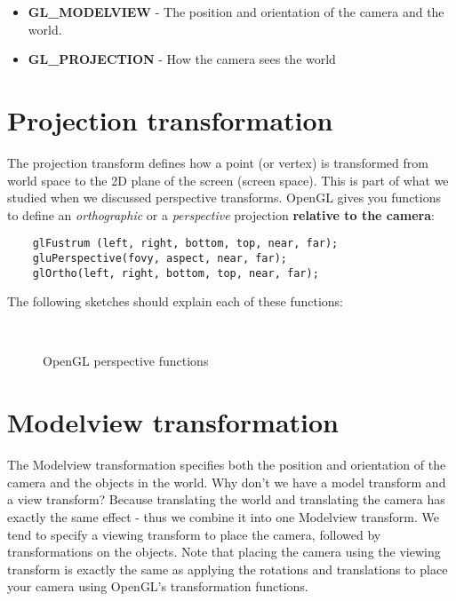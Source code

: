 \documentclass[]{article}
\begin{document}
\begin{itemize}
    \item \textbf{GL\_MODELVIEW} - The position and orientation of the camera and the world.
    \item \textbf{GL\_PROJECTION} - How the camera sees the world
\end{itemize}

\section{Projection transformation}

The projection transform defines how a point (or vertex) is transformed from world space to the 2D plane of the screen (screen space). This is part of what we studied when we discussed perspective transforms. OpenGL gives you functions to define an \emph{orthographic} or a \emph{perspective} projection \textbf{relative to the camera}:

\begin{verbatim}
    glFustrum (left, right, bottom, top, near, far);
    gluPerspective(fovy, aspect, near, far);
    glOrtho(left, right, bottom, top, near, far);
\end{verbatim}

The following sketches should explain each of these functions:

\begin{figure}[htp]
     \centering
     \\
     \caption{OpenGL perspective functions}
     \label{fig:2858multifig}
\end{figure}

\section{Modelview transformation}

The Modelview transformation specifies both the position and orientation of the camera and the objects in the world. Why don't we have a model transform and a view transform? Because translating the world and translating the camera has exactly the same effect - thus we combine it into one Modelview transform. We tend to specify a viewing transform to place the camera, followed by transformations on the objects. Note that placing the camera using the viewing transform is exactly the same as applying the rotations and translations to place your camera using OpenGL's transformation functions.
\end{document}
